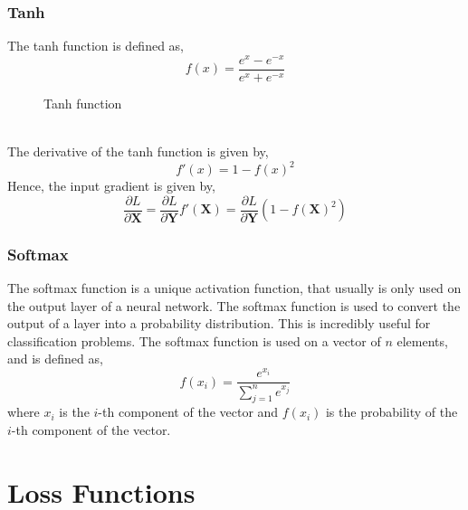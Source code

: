 \documentclass[11pt]{article}
\theoremstyle{definition}
\begin{document}
\subsubsection{Tanh}
The tanh function is defined as,
\begin{equation}
    f(x) = \frac{e^x - e^{-x}}{e^x + e^{-x}}
\end{equation}
\begin{figure}[h]
    \centering
    \caption{Tanh function}
    \label{fig:tanh}
\end{figure}\\
The derivative of the tanh function is given by,
\begin{equation}
    f'(x) = 1 - f(x)^2
\end{equation} 
Hence, the input gradient is given by,
\begin{equation}
    \frac{\partial L}{\partial \mathbf{X}} = 
    \frac{\partial L}{\partial \mathbf{Y}} f'(\mathbf{X}) = 
    \frac{\partial L}{\partial \mathbf{Y}} (1 - f(\mathbf{X})^2)
\end{equation}
\subsubsection{Softmax}
The softmax function is a unique activation function, that usually is only used on the 
output layer of a neural network. The softmax function is used to convert the output of 
a layer into a probability distribution. This is incredibly useful for classification 
problems. The softmax function is used on a vector of $n$ elements, and is defined as,
\begin{equation}
    f(x_i) = \frac{e^{x_i}}{\sum_{j=1}^{n} e^{x_j}}
\end{equation}
where $x_i$ is the $i$-th component of the vector and $f(x_i)$ is the probability of the $i$-th component of the vector.
\section{Loss Functions}
\end{document}
